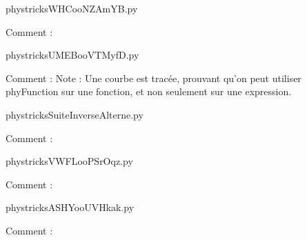     \newcommand{\CaptionFigWHCooNZAmYB}{<+Type your caption here+>}
    \begin{center}
        
    \end{center}
    phystricksWHCooNZAmYB.py

    Comment : 

    \clearpage
    


    \newcommand{\CaptionFigUMEBooVTMyfD}{<+Type your caption here+>}
    \begin{center}
        
    \end{center}
    phystricksUMEBooVTMyfD.py

    Comment : Note : Une courbe est tracée, prouvant qu'on peut utiliser phyFunction sur une fonction, et non seulement sur une expression.

    \clearpage
    


    \newcommand{\CaptionFigSuiteInverseAlterne}{<+Type your caption here+>}
    \begin{center}
        
    \end{center}
    phystricksSuiteInverseAlterne.py

    Comment : 

    \clearpage
    


    \newcommand{\CaptionFigVWFLooPSrOqz}{<+Type your caption here+>}
    \begin{center}
        
    \end{center}
    phystricksVWFLooPSrOqz.py

    Comment : 

    \clearpage
    


    \newcommand{\CaptionFigASHYooUVHkak}{<+Type your caption here+>}
    \begin{center}
        
    \end{center}
    phystricksASHYooUVHkak.py

    Comment : 

    \clearpage
    


